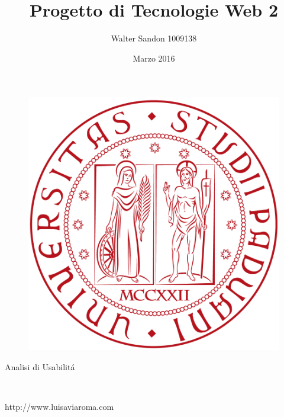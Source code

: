 \documentclass[11pt]{article}
\title{Progetto di Tecnologie Web 2}
\author{Walter Sandon 1009138}
\date{Marzo 2016}
\begin{document}
	\maketitle
	\begin{figure}[h]
		\centering
		\includegraphics[width=0.7\linewidth]{logo-unipd.png}
	\end{figure}
	\begin{center}{\fontsize{40}{50}\selectfont Analisi di Usabilit\'a}\end{center}
	\\
	\begin{center}{\fontsize{30}{50}\selectfont http://www.luisaviaroma.com}\end{center}
\end{document}
